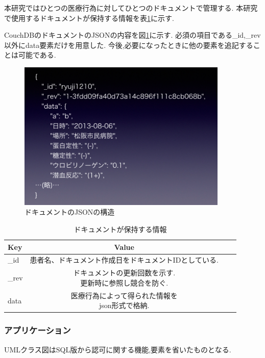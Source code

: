 	本研究ではひとつの医療行為に対してひとつのドキュメントで管理する.
	本研究で使用するドキュメントが保持する情報を表\ref{tab:doc}に示す.

	CouchDBのドキュメントのJSONの内容を図\ref{json-for-doc}に示す.
	必須の項目である\_id,\_rev以外にdata要素だけを用意した.
	今後,必要になったときに他の要素を追記することは可能である.


	\begin{figure}[htbp]
		\begin{center}
			\includegraphics[width=10cm, bb=0 0 1027 737]{./gazou/json-for-doc2.png}
		\end{center}
		\caption{ドキュメントのJSONの構造}
		\label{json-for-doc}
	\end{figure}


	\begin{table}[htb]
		\begin{center}
			\caption{ドキュメントが保持する情報}
			\begin{tabular}{|l|c|r|r|}\hline
			Key & Value \\ \hline \hline
			\_id &  患者名、ドキュメント作成日をドキュメントIDとしている. \\ \hline
			\_rev & \shortstack{ドキュメントの更新回数を示す. \\ 更新時に参照し競合を防ぐ.} \\ \hline
			data & \shortstack{医療行為によって得られた情報を \\ json形式で格納.} \\ \hline
			\end{tabular}
			\label{tab:doc}
		\end{center}
	\end{table}


	\subsubsection{アプリケーション}
		UMLクラス図はSQL版から認可に関する機能,要素を省いたものとなる.


